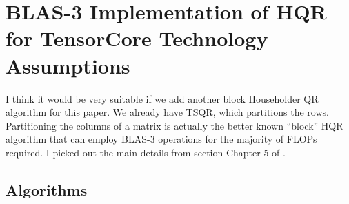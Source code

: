 \documentclass[review,onefignum,onetabnum]{siamart190516}
\newcommand{\R}{\mathbb{R}}
\newcommand{\bb}[1]{\mathbf{#1}}
\begin{document}
\section{BLAS-3 Implementation of HQR for TensorCore Technology Assumptions}
I think it would be very suitable if we add another block Householder QR algorithm for this paper. 
We already have TSQR, which partitions the rows. 
Partitioning the columns of a matrix is actually the better known ``block'' HQR algorithm that can employ BLAS-3 operations for the majority of FLOPs required. 
I picked out the main details from section Chapter 5 of \cite{golub2013matrix}.
\subsection{Algorithms}
\end{document}
